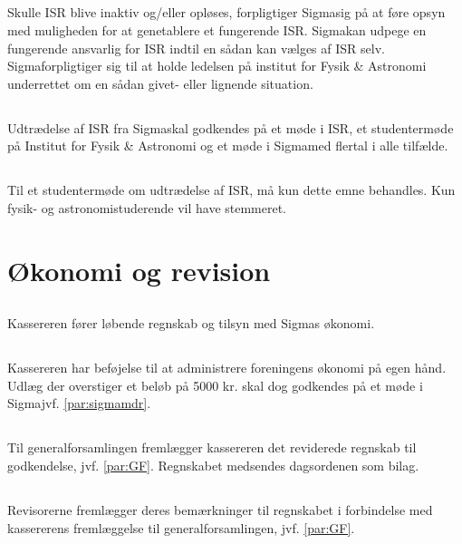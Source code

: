 \documentclass[danish,a4paper,twocolumn]{article}
\newcommand{\foreningen}{Sigma}
\begin{document}
\subsection{}Skulle ISR blive inaktiv og/eller opløses, forpligtiger \foreningen sig på at føre opsyn med muligheden for at genetablere et fungerende ISR. \foreningen kan udpege en fungerende ansvarlig for ISR indtil en sådan kan vælges af ISR selv. \foreningen forpligtiger sig til at holde ledelsen på institut for Fysik \& Astronomi underrettet om en sådan givet- eller lignende situation.
\subsection{}Udtrædelse af ISR fra \foreningen skal godkendes på et møde i ISR, et studentermøde på Institut for  Fysik \& Astronomi og et møde i \foreningen med  flertal i alle tilfælde.
\subsection{}Til et studentermøde om udtrædelse af ISR, må kun dette emne behandles. Kun fysik- og astronomistuderende vil have stemmeret.

\section{Økonomi og revision}
\subsection{}Kassereren fører løbende regnskab og tilsyn med \foreningen s økonomi.
\subsection{}Kassereren har beføjelse til at administrere foreningens økonomi på egen hånd. Udlæg der overstiger et beløb på 5000 kr. skal dog godkendes på et møde i \foreningen jvf. \ref{par:sigmamdr}.
\subsection{}Til generalforsamlingen fremlægger kassereren det reviderede regnskab til godkendelse, jvf. \ref{par:GF}. Regnskabet medsendes dagsordenen som bilag.
\subsection{}Revisorerne fremlægger deres bemærkninger til regnskabet i forbindelse med kassererens fremlæggelse til generalforsamlingen, jvf. \ref{par:GF}.
\end{document}
